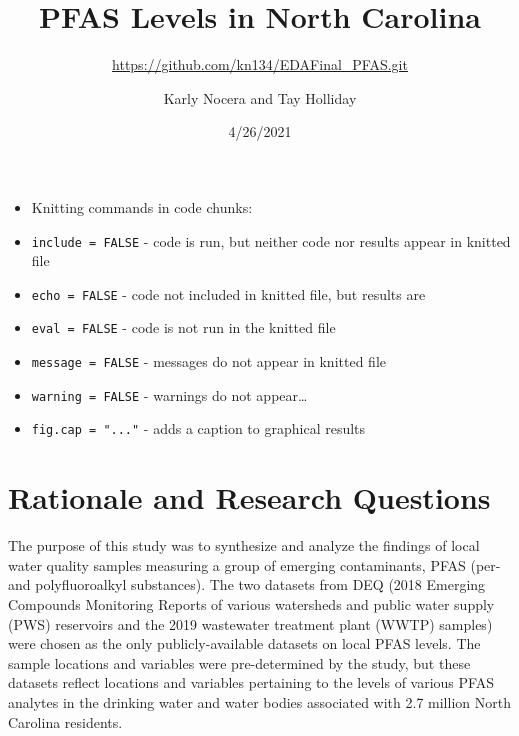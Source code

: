 \documentclass[
  12pt,
]{article}
\title{PFAS Levels in North Carolina}
\subtitle{\url{https://github.com/kn134/EDAFinal_PFAS.git}}
\author{Karly Nocera and Tay Holliday}
\date{4/26/2021}
\newenvironment{Shaded}{\begin{snugshade}}{\end{snugshade}}
\newcommand{\AttributeTok}[1]{\textcolor[rgb]{0.77,0.63,0.00}{#1}}
\newcommand{\CommentTok}[1]{\textcolor[rgb]{0.56,0.35,0.01}{\textit{#1}}}
\newcommand{\ConstantTok}[1]{\textcolor[rgb]{0.00,0.00,0.00}{#1}}
\newcommand{\DecValTok}[1]{\textcolor[rgb]{0.00,0.00,0.81}{#1}}
\newcommand{\FunctionTok}[1]{\textcolor[rgb]{0.00,0.00,0.00}{#1}}
\newcommand{\NormalTok}[1]{#1}
\newcommand{\SpecialCharTok}[1]{\textcolor[rgb]{0.00,0.00,0.00}{#1}}
\providecommand{\tightlist}{%
  \setlength{\itemsep}{0pt}\setlength{\parskip}{0pt}}
\begin{document}
\maketitle

\newpage
\tableofcontents 
\newpage
\listoftables 
\newpage
\listoffigures 
\newpage

\begin{Shaded}
\end{Shaded}

\begin{itemize}
\tightlist
\item
  Knitting commands in code chunks:
\item
  \texttt{include\ =\ FALSE} - code is run, but neither code nor results
  appear in knitted file
\item
  \texttt{echo\ =\ FALSE} - code not included in knitted file, but
  results are
\item
  \texttt{eval\ =\ FALSE} - code is not run in the knitted file
\item
  \texttt{message\ =\ FALSE} - messages do not appear in knitted file
\item
  \texttt{warning\ =\ FALSE} - warnings do not appear\ldots{}
\item
  \texttt{fig.cap\ =\ "..."} - adds a caption to graphical results
\end{itemize}

\hypertarget{rationale-and-research-questions}{%
\section{Rationale and Research
Questions}\label{rationale-and-research-questions}}

The purpose of this study was to synthesize and analyze the findings of
local water quality samples measuring a group of emerging contaminants,
PFAS (per- and polyfluoroalkyl substances). The two datasets from DEQ
(2018 Emerging Compounds Monitoring Reports of various watersheds and
public water supply (PWS) reservoirs and the 2019 wastewater treatment
plant (WWTP) samples) were chosen as the only publicly-available
datasets on local PFAS levels. The sample locations and variables were
pre-determined by the study, but these datasets reflect locations and
variables pertaining to the levels of various PFAS analytes in the
drinking water and water bodies associated with 2.7 million North
Carolina residents.
\end{document}

